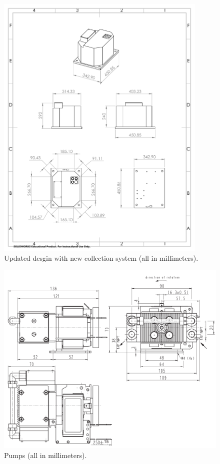 \begin{centering}
  \begin{figure}[h]
    \includegraphics[width=0.9\textwidth]{Figures/payload_plate.pdf}
    \caption{Updated desgin with new collection system (all in millimeters).}
    \label{fig:PayloadPlate}
  \end{figure}

  \newpage
  
  \begin{figure}[h]
    \includegraphics[width=\textwidth]{Figures/pumps.pdf}
    \caption{Pumps (all in millimeters).}
    \label{fig:Pumps}
  \end{figure}
  

\end{centering}
